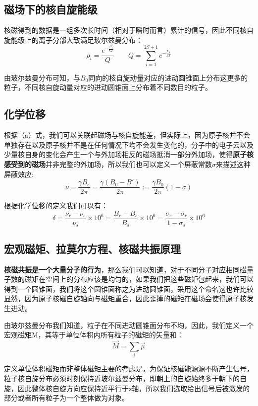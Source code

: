 \subsection{磁场下的核自旋能级}

核磁得到的数据是一组多次长时间（相对于瞬时而言）累计的信号，因此不同核自旋能级上的离子分部大致满足玻尔兹曼分布：
\[\rho_i=\frac{e^{-\frac{E_i}{kT}}}{Q} \qquad Q=\sum_{i=1}^{2S+1}e^{-\frac{E_i}{kT}} \tag{b}\]

由玻尔兹曼分布可知，与$B_0$同向的核自旋动量对应的进动圆锥面上分布这更多的粒子，不同核自旋动量对应的进动圆锥面上分布着不同数目的粒子。

\subsection{化学位移}

根据（a）式，我们可以关联起磁场与核自旋能差，但实际上，因为原子核并不会单独存在以及原子核并不是在任何情况下均不会发生变化的，分子中的电子云以及少量核自身的变化会产生一个与外加场相反的磁场抵消一部分外加场，使得\textbf{原子核感受到的磁场}并非完整的外加场，所以我们也可以定义一个屏蔽常数$\sigma$来描述这种屏蔽效应:
\[\nu =\frac{\gamma B_e}{2\pi}=\frac{\gamma (B_0-B')}{2\pi}:=\frac{\gamma B_0}{2\pi}(1-\sigma) \]

根据化学位移的定义我们可以有：
\[\delta=\frac{\nu_r-\nu_s}{\nu_s} \times 10^6=\frac{B_r-B_s}{B_s} \times 10^6=\frac{\sigma_s-\sigma_r}{1-\sigma_s} \times 10^6\]

\subsection{宏观磁矩、拉莫尔方程、核磁共振原理}

\textbf{核磁共振是一个大量分子的行为}，那么我们可以知道，对于不同分子对应相同磁量子数的磁矩在空间上的分布应该是均匀的，如果我们把这些磁矩包起来，我们可以得到一个圆锥面，我们将这个圆锥面称之为进动圆锥面，采用这个命名这也许比较显然，因为原子核磁自旋轴向与磁矩重合，因此歪掉的磁矩在磁场会使得原子核发生进动。

由玻尔兹曼分布我们知道，粒子在不同进动圆锥面分布不均，因此，我们定义一个宏观磁矩M，其等于单位体积内所有粒子的磁矩的矢量和：
\[\overrightarrow{M}=\sum_i \overrightarrow{\mu}\]

定义单位体积磁矩而非整体磁矩主要的考虑是，为保证核磁能源源不断产生信号，粒子核自旋分布必须时刻保持近玻尔兹曼分布，即朝上的自旋始终多于朝下的自旋，因此整体核自旋方向应保持近平行于z轴，所以我们选取给出信号后被激发的部分或者所有粒子为一个整体做为对象。

